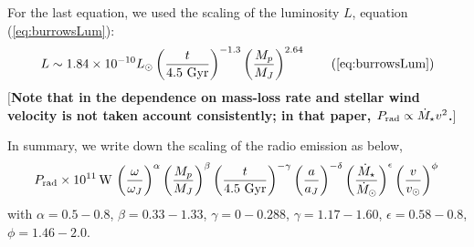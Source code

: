 \documentclass[iop,numberedappendix,apj]{emulateapj}
\def\memoYF#1{\color{red}$[${\bf #1}$]$ \color{black}}
\begin{document}
For the last equation, we used the scaling of the luminosity $L$, equation (\ref{eq:burrowsLum}):
\begin{equation}
L \sim 1.84\times10^{-10} L_\odot \left( \frac{t}{4.5 \rm~Gyr} \right)^{-1.3} \left( \frac{M_p}{M_J} \right)^{2.64} \tag{\ref{eq:burrowsLum}}
\end{equation} 
\memoYF{Note that in \citet{ignace2010} the dependence on mass-loss rate and stellar wind velocity is not taken account consistently; in that paper, $P_{\rm rad} \propto \dot M_{\star } v^2$.}

In summary, we write down the scaling of the radio emission as below, 
\begin{equation}
P_{\rm rad} \times 10^{11} \,{\rm W}\, \left( \frac{\omega}{\omega _J} \right)^{\alpha } \left( \frac{M_p}{M_J} \right)^{\beta }  \left( \frac{t}{4.5 \rm~Gyr} \right)^{-\gamma }  \left( \frac{a}{a_J} \right)^{-\delta }  \left( \frac{\dot M_\star}{\dot M_{\odot}} \right)^{\epsilon } \left( \frac{v}{v_{\odot}} \right)^{\phi } \, \\
\end{equation} 
with $\alpha = 0.5-0.8$, $\beta = 0.33-1.33$, $\gamma = 0-0.288$, $\gamma = 1.17-1.60$, $\epsilon = 0.58-0.8$, $\phi = 1.46-2.0$. 
\end{document}

